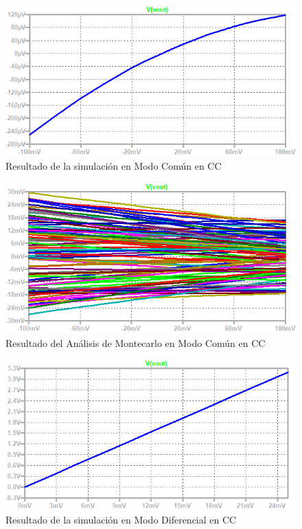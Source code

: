 \begin{figure}[ht]
\begin{center}
\includegraphics[scale=1]{res/spice/spice_cm_dc.png}
\caption{Resultado de la simulación en Modo Común en CC}
\label{e4:fig_spice_cm_dc_res}
\end{center}
\end{figure}

\begin{figure}[ht]
\begin{center}
\includegraphics[scale=1]{res/spice/spice_cm_dc_mc.png}
\caption{Resultado del Análisis de Montecarlo en Modo Común en CC}
\label{e4:fig_spice_cm_dc_mc}
\end{center}
\end{figure}

\begin{figure}[ht]
\begin{center}
\includegraphics[scale=1]{res/spice/spice_dm_dc.png}
\caption{Resultado de la simulación en Modo Diferencial en CC}
\label{e4:fig_spice_dm_dc_res}
\end{center}
\end{figure}

